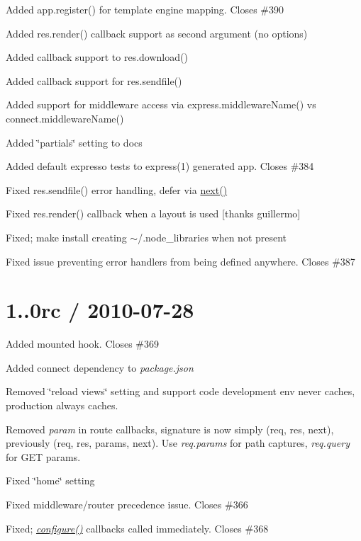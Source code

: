 \begin{DoxyItemize}
\item Added {\ttfamily app.\+register()} for template engine mapping. Closes \#390
\item Added {\ttfamily res.\+render()} callback support as second argument (no options)
\item Added callback support to {\ttfamily res.\+download()}
\item Added callback support for {\ttfamily res.\+sendfile()}
\item Added support for middleware access via {\ttfamily express.\+middleware\+Name()} vs {\ttfamily connect.\+middleware\+Name()}
\item Added \char`\"{}partials\char`\"{} setting to docs
\item Added default expresso tests to {\ttfamily express(1)} generated app. Closes \#384
\item Fixed {\ttfamily res.\+sendfile()} error handling, defer via {\ttfamily \hyperlink{057__caller__graphs_8tcl_a3f808a00e1b937978455d707851ab33a}{next()}}
\item Fixed {\ttfamily res.\+render()} callback when a layout is used \mbox{[}thanks guillermo\mbox{]}
\item Fixed; {\ttfamily make install} creating $\sim$/.node\+\_\+libraries when not present
\item Fixed issue preventing error handlers from being defined anywhere. Closes \#387
\end{DoxyItemize}

\section*{1..\+0rc / 2010-\/07-\/28 }


\begin{DoxyItemize}
\item Added mounted hook. Closes \#369
\item Added connect dependency to {\itshape package.\+json}
\item Removed \char`\"{}reload views\char`\"{} setting and support code development env never caches, production always caches.
\item Removed {\itshape param} in route callbacks, signature is now simply (req, res, next), previously (req, res, params, next). Use {\itshape req.\+params} for path captures, {\itshape req.\+query} for G\+E\+T params.
\item Fixed \char`\"{}home\char`\"{} setting
\item Fixed middleware/router precedence issue. Closes \#366
\item Fixed; {\itshape \hyperlink{namespaceversion_aedc91fd7b4b027899ea1441123d88f96}{configure()}} callbacks called immediately. Closes \#368
\end{DoxyItemize}

